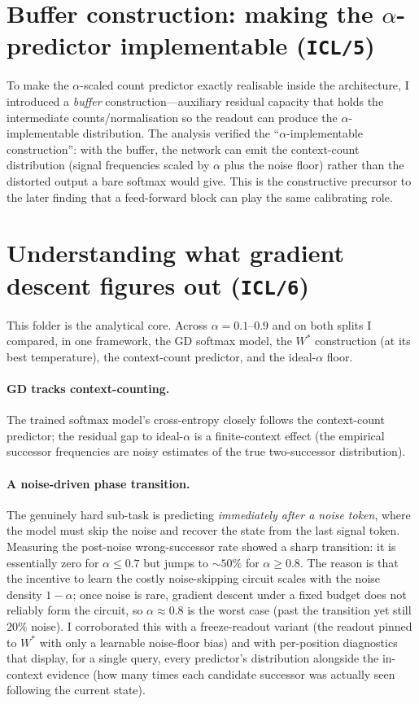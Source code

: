 \documentclass[12pt]{article}
\begin{document}
\section{Buffer construction: making the $\alpha$-predictor implementable (\texttt{ICL/5})}
To make the $\alpha$-scaled count predictor exactly realisable inside the architecture, I
introduced a \emph{buffer} construction---auxiliary residual capacity that holds the intermediate
counts/normalisation so the readout can produce the $\alpha$-implementable distribution. The
analysis verified the ``$\alpha$-implementable construction'': with the buffer, the network can
emit the context-count distribution (signal frequencies scaled by $\alpha$ plus the noise floor)
rather than the distorted output a bare softmax would give. This is the constructive precursor to
the later finding that a feed-forward block can play the same calibrating role.

\section{Understanding what gradient descent figures out (\texttt{ICL/6})}
This folder is the analytical core. Across $\alpha=0.1\text{--}0.9$ and on both splits I compared,
in one framework, the GD softmax model, the $W^{*}$ construction (at its best temperature), the
context-count predictor, and the ideal-$\alpha$ floor.

\paragraph{GD tracks context-counting.} The trained softmax model's cross-entropy closely follows
the context-count predictor; the residual gap to ideal-$\alpha$ is a finite-context effect (the
empirical successor frequencies are noisy estimates of the true two-successor distribution).

\paragraph{A noise-driven phase transition.} The genuinely hard sub-task is predicting
\emph{immediately after a noise token}, where the model must skip the noise and recover the state
from the last signal token. Measuring the post-noise wrong-successor rate showed a sharp transition:
it is essentially zero for $\alpha\le 0.7$ but jumps to $\sim 50\%$ for $\alpha\ge 0.8$. The reason
is that the incentive to learn the costly noise-skipping circuit scales with the noise density
$1-\alpha$; once noise is rare, gradient descent under a fixed budget does not reliably form the
circuit, so $\alpha\approx 0.8$ is the worst case (past the transition yet still $20\%$ noise). I
corroborated this with a freeze-readout variant (the readout pinned to $W^{*}$ with only a learnable
noise-floor bias) and with per-position diagnostics that display, for a single query, every
predictor's distribution alongside the in-context evidence (how many times each candidate successor
was actually seen following the current state).
\end{document}
